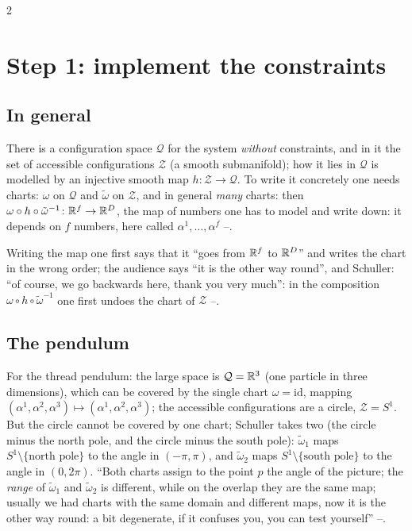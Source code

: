 \begin{paracol}{2}
\section{Step 1: implement the constraints}\label{sec:pc-step1}

\subsection{In general}\label{ssec:pc-step1-gen}

\begin{recall}\label{rec:pc-step1}
There is a configuration space $\mathcal Q$ for the system \emph{without} constraints, and in it the set of accessible configurations $\mathcal Z$ (a smooth submanifold); how it lies in $\mathcal Q$ is modelled by an injective smooth map $h\colon\mathcal Z\to\mathcal Q$. To write it concretely one needs charts: $\omega$ on $\mathcal Q$ and $\tilde\omega$ on $\mathcal Z$, and in general \emph{many} charts: then $\omega\circ h\circ\tilde\omega^{-1}\colon\mathbb{R}^f\to\mathbb{R}^{D}$, the map of numbers one has to model and write down: it depends on $f$ numbers, here called $\alpha^1,\dots,\alpha^f$ --.
\end{recall}

\begin{coursenote}\label{cn:pc-inv}
Writing the map one first says that it ``goes from $\mathbb{R}^f$ to $\mathbb{R}^D$'' and writes the chart in the wrong order; the audience says ``it is the other way round'', and Schuller: ``of course, we go backwards here, thank you very much'': in the composition $\omega\circ h\circ\tilde\omega^{-1}$ one first undoes the chart of $\mathcal Z$ --.
\end{coursenote}

\subsection{The pendulum}\label{ssec:pc-step1-pend}

For the thread pendulum: the large space is $\mathcal Q=\mathbb{R}^3$ (one particle in three dimensions), which can be covered by the single chart $\omega=\mathrm{id}$, mapping $(\alpha^1,\alpha^2,\alpha^3)\mapsto(\alpha^1,\alpha^2,\alpha^3)$; the accessible configurations are a circle, $\mathcal Z=S^1$. But the circle cannot be covered by one chart; Schuller takes two (the circle minus the north pole, and the circle minus the south pole): $\tilde\omega_1$ maps $S^1\setminus\{\text{north pole}\}$ to the angle in $(-\pi,\pi)$, and $\tilde\omega_2$ maps $S^1\setminus\{\text{south pole}\}$ to the angle in $(0,2\pi)$. ``Both charts assign to the point $p$ the angle of the picture; the \emph{range} of $\tilde\omega_1$ and $\tilde\omega_2$ is different, while on the overlap they are the same map; usually we had charts with the same domain and different maps, now it is the other way round: a bit degenerate, if it confuses you, you can test yourself'' --.


\end{paracol}

